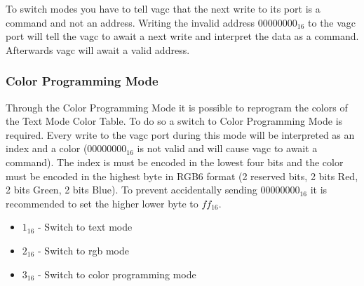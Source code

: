 To switch modes you have to tell vagc that the next write to its port is a command and not an address. Writing the invalid address $00000000_{16}$ to the vagc port
will tell the vagc to await a next write and interpret the data as a command. Afterwards vagc will await a valid address. 

\subsubsection{Color Programming Mode}

Through the Color Programming Mode it is possible to reprogram the colors of the Text Mode Color Table. To do so a switch to Color Programming Mode is required.
Every write to the vagc port during this mode will be interpreted as an index and a color ($00000000_{16}$ is not valid and will cause vagc to await a command). 
The index is must be encoded in the lowest four bits and the color must be encoded in the highest byte in RGB6 format (2 reserved bits, 2 bits Red, 2 bits Green, 2 bits Blue).
To prevent accidentally sending $00000000_{16}$ it is recommended to set the higher lower byte to $ff_{16}$. 


\begin{itemize}
  \item $1_{16}$ - Switch to text mode
  \item $2_{16}$ - Switch to rgb mode
  \item $3_{16}$ - Switch to color programming mode
\end{itemize}
